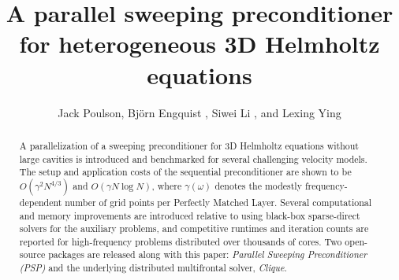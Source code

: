 
\title{A parallel sweeping preconditioner for heterogeneous 3D Helmholtz equations}

\renewcommand{\thefootnote}{\fnsymbol{footnote}}

\address{
\footnotemark[1] ICES,
        University of Texas at Austin, 1 University Station C0200, 
        Austin, TX, 78712 (jack.poulson@gmail.com). This author was also 
        supported by a CAM fellowship. \\
\footnotemark[2] Department of Mathematics and ICES,
        University of Texas at Austin, 1 University Station C1200,
        Austin, TX, 78712 (engquist@ices.utexas.edu). This author was also 
        supported by NSF grant DMS-1016577. \\
\footnotemark[3] Jackson School of Geosciences,
        University of Texas at Austin, 1 University Station C1160,
        Austin, TX, 78712 (siwei.li@utexas.edu). \\
\footnotemark[4] Department of Mathematics and ICES, 
        University of Texas at Austin, 1 University Station C1200,
        Austin, TX, 78712 (lexing@math.utexas.edu). This author was supported 
        by NSF CAREER grant DMS-0846501, NSF grant DMS-1016577, and 
        funding from KAUST.}             

\author{Jack Poulson\footnotemark[1],
        Bj\"orn Engquist \footnotemark[2],
        Siwei Li \footnotemark[3],
        and Lexing Ying \footnotemark[4]}


\maketitle

\begin{abstract}
A parallelization of a sweeping preconditioner for 3D Helmholtz equations 
without large cavities is introduced and benchmarked for several 
challenging velocity models. 
The setup and application costs of the
sequential preconditioner are shown to be $O(\gamma^2 N^{4/3})$ 
and $O(\gamma N \log N)$, where $\gamma(\omega)$ denotes the modestly 
frequency-dependent number of grid points per Perfectly Matched Layer. 
Several computational and memory improvements are introduced relative to 
using black-box sparse-direct solvers for the auxiliary problems, and 
competitive runtimes and iteration counts are reported for high-frequency 
problems distributed over thousands of cores.
Two open-source packages are released along with this paper: \emph{Parallel 
Sweeping Preconditioner (PSP)} and the underlying distributed multifrontal 
solver, \emph{Clique}.
\end{abstract}

